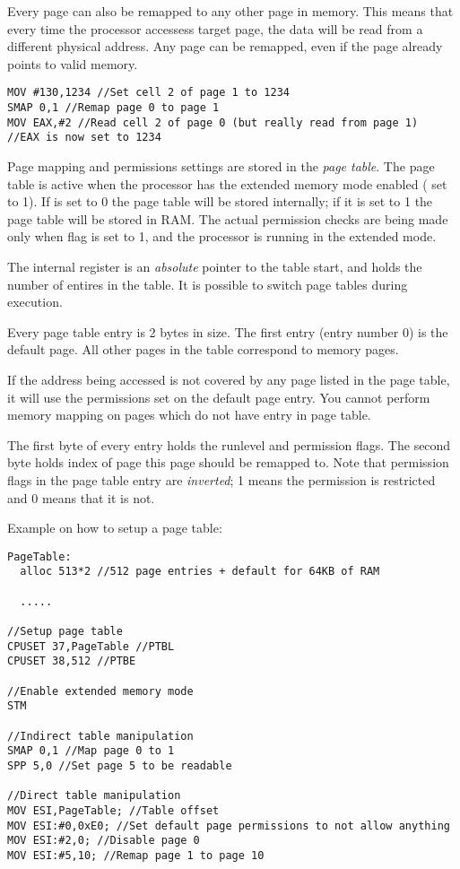 Every page can also be remapped to any other page in memory. This means that every time the processor accessess target page, the data will be read from a different physical address. Any page can be remapped, even if the page already points to valid memory.

\begin{verbatim}
MOV #130,1234 //Set cell 2 of page 1 to 1234
SMAP 0,1 //Remap page 0 to page 1
MOV EAX,#2 //Read cell 2 of page 0 (but really read from page 1)
//EAX is now set to 1234
\end{verbatim}

Page mapping and permissions settings are stored in the \emph{page table}. The page table is active when the processor has the extended memory mode enabled ( set to 1). If  is set to 0 the page table will be stored internally; if it is set to 1 the page table will be stored in RAM. The actual permission checks are being made only when  flag is set to 1, and the processor is running in the extended mode.

The  internal register is an \emph{absolute} pointer to the table start, and  holds the number of entires in the table. It is possible to switch page tables during execution.

Every page table entry is 2 bytes in size. The first entry (entry number 0) is the default page. All other pages in the table correspond to memory pages.

If the address being accessed is not covered by any page listed in the page table, it will use the permissions set on the default page entry. You cannot perform memory mapping on pages which do not have entry in page table.

The first byte of every entry holds the runlevel and permission flags. The second byte holds index of page this page should be remapped to. Note that permission flags in the page table entry are \emph{inverted}; 1 means the permission is restricted and 0 means that it is not.

Example on how to setup a page table:
\begin{verbatim}
PageTable:
  alloc 513*2 //512 page entries + default for 64KB of RAM
  
  .....
  
//Setup page table
CPUSET 37,PageTable //PTBL
CPUSET 38,512 //PTBE

//Enable extended memory mode
STM

//Indirect table manipulation
SMAP 0,1 //Map page 0 to 1
SPP 5,0 //Set page 5 to be readable

//Direct table manipulation
MOV ESI,PageTable; //Table offset
MOV ESI:#0,0xE0; //Set default page permissions to not allow anything
MOV ESI:#2,0; //Disable page 0
MOV ESI:#5,10; //Remap page 1 to page 10
\end{verbatim}

